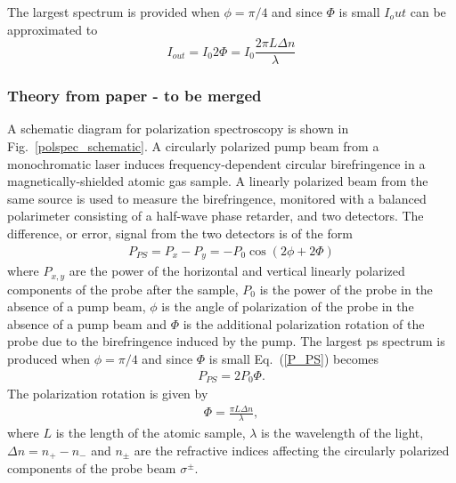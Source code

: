 The largest spectrum is provided when $\phi=\pi/4$ and since $\Phi$ is small $I_out$ can be approximated to
\begin{equation}
I_{out} = I_0 2\Phi = I_0 \frac{2\pi L \Delta n}{\lambda}
\end{equation}

\subsubsection{Theory from paper - to be merged}
A schematic diagram for polarization spectroscopy is shown in Fig.~\ref{polspec_schematic}.
A circularly polarized pump beam from a monochromatic laser induces frequency-dependent circular birefringence in a magnetically-shielded atomic gas sample.
A linearly polarized beam from the same source is used to measure the birefringence, monitored with a balanced polarimeter consisting of a half-wave phase retarder,  and two detectors.
The difference, or error, signal from the two detectors is of the form \cite{pearman_polarization_2002}
\begin{align}
P_{PS} = P_x-P_y = -P_0 \cos(2\phi+2\Phi)\label{P_PS}
\end{align}
where $P_{x,y}$ are the power of the horizontal and vertical linearly polarized components of the probe after the sample, $P_0$ is the power of the probe in the absence of a pump beam, $\phi$ is the angle of polarization of the probe in the absence of a pump beam and $\Phi$ is the additional polarization rotation of the probe due to the birefringence induced by the pump.
The largest \gls*{ps} spectrum is produced when $\phi=\pi/4$ and since $\Phi$ is small Eq.~(\ref{P_PS})  becomes
\begin{align}
P_{PS} = 2P_0 \Phi.
\end{align}
The polarization rotation is given by
\begin{align}
\Phi = \frac{\pi L \Delta n}{\lambda},
\end{align}
where $L$ is the length of the atomic sample, $\lambda$ is the wavelength of the light, $\Delta n = n_+ - n_-$ and $n_\pm$ are the refractive indices affecting the circularly polarized components of the probe beam $\sigma^\pm$.
